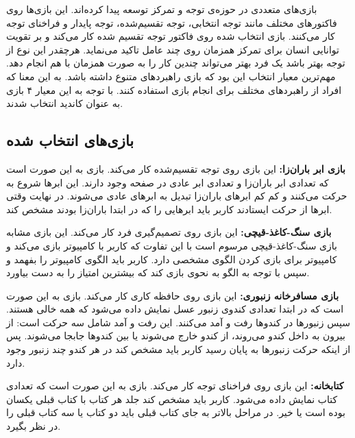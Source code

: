 \documentclass[twoside, a4paper,11pt]{book}
\numberwithin{equation}{chapter}
\numberwithin{table}{chapter}
\numberwithin{figure}{chapter}
\numberwithin{equation}{chapter}
\begin{document}
بازی‌های متعددی در حوزه‌ی توجه و تمرکز توسعه پیدا کرده‌اند. این بازی‌ها روی فاکتورهای مختلف مانند توجه انتخابی، توجه تقسیم‌شده، توجه پایدار و فراخنای توجه کار می‌کنند. بازی انتخاب شده روی فاکتور توجه تقسیم شده کار می‌کند و بر تقویت توانایی انسان برای تمرکز همزمان روی چند عامل تاکید می‌نماید. هرچقدر این نوع از توجه بهتر باشد یک فرد بهتر می‌تواند چندین کار را به صورت همزمان با هم انجام دهد. 
مهم‌ترین معیار انتخاب این بود که بازی راهبرد‌های متنوع داشته باشد. به این معنا که افراد از راهبردهای مختلف برای انجام بازی استفاده کنند. با توجه به این معیار ۴ بازی به عنوان کاندید انتخاب شدند.
\subsection{بازی‌های انتخاب شده}
\textbf{بازی ابر باران‌زا:} این بازی روی توجه تقسیم‌شده کار می‌کند. بازی به این صورت است که تعدادی ابر باران‌زا و تعدادی ابر عادی در صفحه وجود دارند. این ابرها شروع به حرکت می‌کنند و کم کم ابرهای باران‌زا تبدیل به ابرهای عادی می‌شوند. در نهایت وقتی ابرها از حرکت ایستادند کاربر باید ابرهایی را که در ابتدا باران‌زا بودند مشخص کند.

\textbf{بازی سنگ-کاغذ-قیچی:} این بازی روی تصمیم‌گیری فرد کار می‌کند. این بازی مشابه بازی سنگ-کاغذ-قیچی مرسوم است با این تفاوت که کاربر با کامپیوتر بازی می‌کند و کامپیوتر برای بازی کردن الگوی مشخصی دارد. کاربر باید الگوی کامپیوتر را بفهمد و سپس با توجه به الگو به نحوی بازی کند که بیشترین امتیاز را به دست بیاورد.

\textbf{بازی مسافرخانه زنبوری:} این بازی روی حافظه کاری کار می‌کند. بازی به این صورت است که در ابتدا تعدادی کندوی زنبور عسل نمایش داده می‌شود که همه خالی هستند. سپس زنبورها در کندوها رفت و آمد می‌کنند. این رفت و آمد شامل سه حرکت است: از بیرون به داخل کندو می‌روند، از کندو خارج می‌شوند یا بین کندوها جابجا می‌شوند. پس از اینکه حرکت زنبورها به پایان رسید کاربر باید مشخص کند در هر کندو چند زنبور وجود دارد.

\textbf{کتابخانه:} این بازی روی فراخنای توجه کار می‌کند. بازی به این صورت است که تعدادی کتاب نمایش داده می‌شود. کاربر باید مشخص کند جلد هر کتاب با کتاب قبلی یکسان بوده است یا خیر. در مراحل بالاتر به جای کتاب قبلی باید دو کتاب یا سه کتاب قبلی را در نظر بگیرد.
\end{document}
